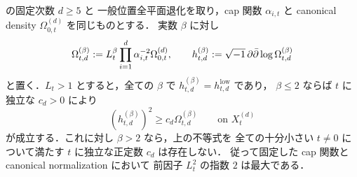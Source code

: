 \documentclass[a4paper,11pt]{ltjsarticle}
\numberwithin{equation}{section}
\theoremstyle{plain}
\theoremstyle{definition}
\theoremstyle{remark}
\begin{document}
\begin{proposition}
\label{coarse:prop:capped-prefactor-sharp}
 の固定次数 $d\ge5$ と
一般位置全平面退化を取り，cap 関数 $\alpha_{i,t}$ と
canonical density $\Omega_{0,t}^{(d)}$ を同じものとする．
実数 $\beta$ に対し
\[
 \Omega_{t,d}^{(\beta)}
  :=L_t^\beta\prod_{i=1}^d\alpha_{i,t}^{-2}\Omega_{0,t}^{(d)},
 \qquad h_{t,d}^{(\beta)}:=\sqrt{-1}\,\partial\bar\partial\log\Omega_{t,d}^{(\beta)}
\]
と置く．$L_t>1$ とすると，全ての $\beta$ で
$h_{t,d}^{(\beta)}=h_{t,d}^{\mathrm{low}}$ であり，
$\beta\le2$ ならば $t$ に独立な $c_d>0$ により
\[
 (h_{t,d}^{(\beta)})^2\ge c_d\Omega_{t,d}^{(\beta)}
 \qquad\text{on }X_t^{(d)}
\]
が成立する．これに対し $\beta>2$ なら，上の不等式を
全ての十分小さい $t\ne0$ について満たす
$t$ に独立な正定数 $c_d$ は存在しない．
従って固定した cap 関数と canonical normalization において
前因子 $L_t^2$ の指数 $2$ は最大である．
\end{proposition}
\end{document}
